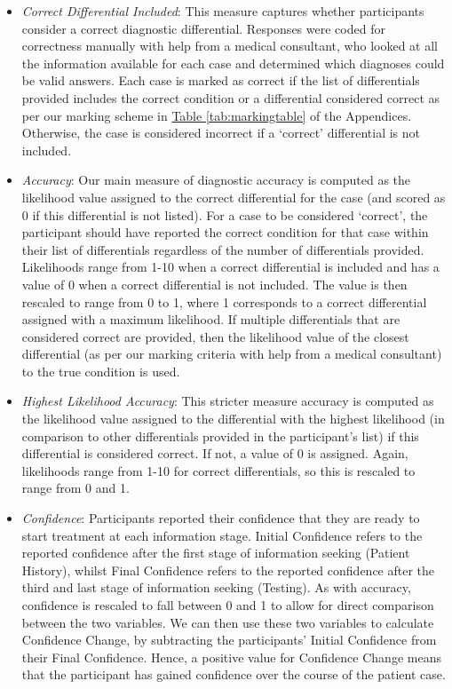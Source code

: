 \documentclass[a4paper, nobind]{templates/ociamthesis}
\begin{document}
\begin{itemize}
\item
  \emph{Correct Differential Included}: This measure captures whether participants consider a correct diagnostic differential. Responses were coded for correctness manually with help from a medical consultant, who looked at all the information available for each case and determined which diagnoses could be valid answers. Each case is marked as correct if the list of differentials provided includes the correct condition or a differential considered correct as per our marking scheme in \hyperref[tab:markingtable]{Table \ref{tab:markingtable}} of the Appendices. Otherwise, the case is considered incorrect if a `correct' differential is not included.
\item
  \emph{Accuracy}: Our main measure of diagnostic accuracy is computed as the likelihood value assigned to the correct differential for the case (and scored as 0 if this differential is not listed). For a case to be considered `correct', the participant should have reported the correct condition for that case within their list of differentials regardless of the number of differentials provided. Likelihoods range from 1-10 when a correct differential is included and has a value of 0 when a correct differential is not included. The value is then rescaled to range from 0 to 1, where 1 corresponds to a correct differential assigned with a maximum likelihood. If multiple differentials that are considered correct are provided, then the likelihood value of the closest differential (as per our marking criteria with help from a medical consultant) to the true condition is used.
\item
  \emph{Highest Likelihood Accuracy}: This stricter measure accuracy is computed as the likelihood value assigned to the differential with the highest likelihood (in comparison to other differentials provided in the participant's list) if this differential is considered correct. If not, a value of 0 is assigned. Again, likelihoods range from 1-10 for correct differentials, so this is rescaled to range from 0 and 1.
\item
  \emph{Confidence}: Participants reported their confidence that they are ready to start treatment at each information stage. Initial Confidence refers to the reported confidence after the first stage of information seeking (Patient History), whilst Final Confidence refers to the reported confidence after the third and last stage of information seeking (Testing). As with accuracy, confidence is rescaled to fall between 0 and 1 to allow for direct comparison between the two variables. We can then use these two variables to calculate Confidence Change, by subtracting the participants' Initial Confidence from their Final Confidence. Hence, a positive value for Confidence Change means that the participant has gained confidence over the course of the patient case.

\end{itemize}
\end{document}
